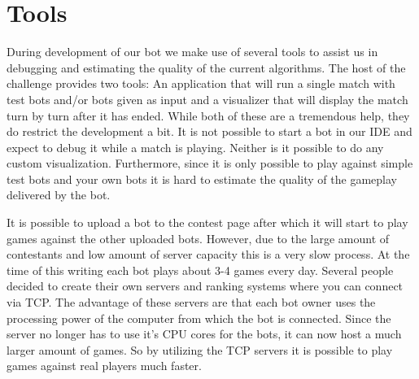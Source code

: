 \section{Tools}
During development of our bot we make use of several tools to assist us in debugging and estimating the quality of the current algorithms. The host of the challenge provides two tools: An application that will run a single match with test bots and/or bots given as input and a visualizer that will display the match turn by turn after it has ended. While both of these are a tremendous help, they do restrict the development a bit. It is not possible to start a bot in our IDE and expect to debug it while a match is playing. Neither is it possible to do any custom visualization. Furthermore, since it is only possible to play against simple test bots and your own bots it is hard to estimate the quality of the gameplay delivered by the bot.

It is possible to upload a bot to the contest page after which it will start to play games against the other uploaded bots. However, due to the large amount of contestants and low amount of server capacity this is a very slow process. At the time of this writing each bot plays about 3-4 games every day. Several people decided to create their own servers and ranking systems where you can connect via TCP. The advantage of these servers are that each bot owner uses the processing power of the computer from which the bot is connected. Since the server no longer has to use it's CPU cores for the bots, it can now host a much larger amount of games. So by utilizing the TCP servers it is possible to play games against real players much faster.

